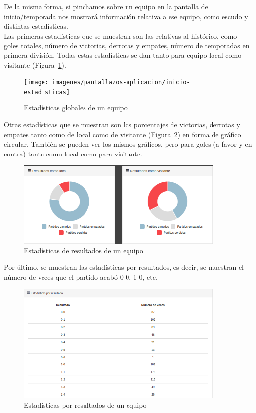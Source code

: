 De la misma forma, si pinchamos sobre un equipo en la pantalla de inicio/temporada nos mostrará información relativa a ese equipo, como escudo y distintas estadísticas. \\

Las primeras estadísticas que se muestran son las relativas al histórico, como goles totales, número de victorias, derrotas y empates, número de temporadas en primera división. Todas estas estadísticas se dan tanto para equipo local como visitante (Figura~\ref{fig:equipo-estadisticas}).\\

\begin{figure}[htb]
\centering
\texttt{[image: imagenes/pantallazos-aplicacion/inicio-estadisticas]}
\caption{Estadísticas globales de un equipo}
\label{fig:equipo-estadisticas}
\end{figure}

Otras estadísticas que se muestran son los porcentajes de victorias, derrotas y empates tanto como de local como de visitante (Figura~\ref{fig:equipo-local}) en forma de gráfico circular. También se pueden ver los mismos gráficos, pero para goles (a favor y en contra) tanto como local como para visitante.\\

\begin{figure}[htb]
\centering
\includegraphics[width=0.9\textwidth]{imagenes/pantallazos-aplicacion/equipo-local}
\caption{Estadísticas de resultados de un equipo}
\label{fig:equipo-local}
\end{figure}

Por último, se muestran las estadísticas por resultados, es decir, se muestran el número de veces que el partido acabó 0-0, 1-0, etc. \\

\begin{figure}[htb]
\centering
\includegraphics[width=0.9\textwidth]{imagenes/pantallazos-aplicacion/equipo-resultados}
\caption{Estadísticas por resultados de un equipo}
\label{fig:equipo-resultados}
\end{figure}

